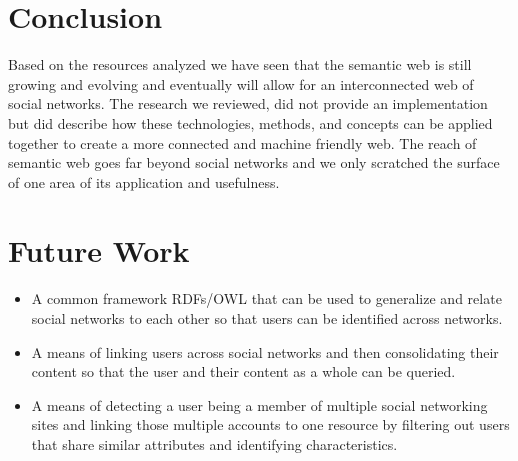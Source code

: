 \documentclass[10pt,journal,compsoc]{IEEEtran}
\begin{document}
\section{Conclusion}
Based on the resources analyzed we have seen that the semantic web is still growing and evolving and eventually will allow for an interconnected web of social networks. The research we reviewed, did not provide an implementation but did describe how these technologies, methods, and concepts can be applied together to create a more connected and machine friendly web. The reach of semantic web goes far beyond social networks and we only scratched the surface of one area of its application and usefulness.


\section{Future Work}
\begin{itemize}
\item
A common framework RDFs/OWL that can be used to generalize and relate social networks to each other so that users can be identified across networks.
\item
A means of linking users across social networks and then consolidating their content so that the user and their content as a whole can be queried.
\item
A means of detecting a user being a member of multiple social networking sites and linking those multiple accounts to one resource by filtering out users that share similar attributes and identifying characteristics.
\end{itemize}

%




 
\nocite{*}

\end{document}
